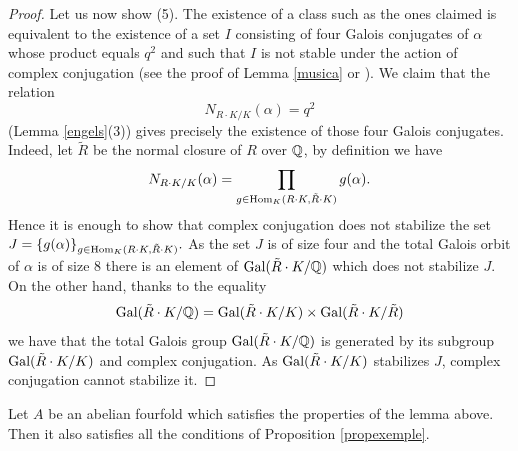 \begin{proof}
Let us  now show (5). The existence of a class such as the ones claimed is equivalent to the existence of a set $I$ consisting of four Galois conjugates of $\alpha$  whose product equals $q^2$  and such that $I$ is not stable under the action of   complex conjugation (see the proof of  Lemma \ref{musica} or \cite[\S 2]{Zah}). We claim that the relation
\[N_{R\cdot K/K}(\alpha) = q^2 \]
(Lemma \ref{engels}(3))  gives precisely the existence of those four Galois conjugates. Indeed, let $\tilde{R}$ be the normal closure of $R$ over $\mathbb{Q}$, by definition we have
\[N_{R\cdot K/K}(\alpha) = \prod_{g \in \textnormal{Hom}_K( R\cdot K , \tilde{R}\cdot K)} g(\alpha).\]
Hence it is enough to show that  complex conjugation does not stabilize the set $J=\{g(\alpha)\}_{g \in \textnormal{Hom}_K( R\cdot K , \tilde{R}\cdot K)}.$ As the set   $J$ is of size four and the total Galois orbit of $\alpha$ is of size $8$ there is an element of $\textnormal{Gal}(\tilde{R}\cdot K/\mathbb{Q})$ which does not stabilize $J$.
On the other hand, thanks to the equality \[\textnormal{Gal}(\tilde{R}\cdot K/\mathbb{Q}) = \textnormal{Gal}(\tilde{R}\cdot K/K) \times \textnormal{Gal}(\tilde{R}\cdot K/\tilde{R})\]
we have that the total Galois group $\textnormal{Gal}(\tilde{R}\cdot K/\mathbb{Q})$ is generated by its subgroup $ \textnormal{Gal}(\tilde{R}\cdot K/K) $ and  complex conjugation. As  $ \textnormal{Gal}(\tilde{R}\cdot K/K) $ stabilizes $J$,   complex conjugation cannot stabilize it.
\end{proof}
\begin{lemma}
\notready\label{lemmafine}
Let $A$ be an abelian fourfold which satisfies the properties of the lemma above. Then it also satisfies all the conditions of Proposition \ref{propexemple}.
\end{lemma}
